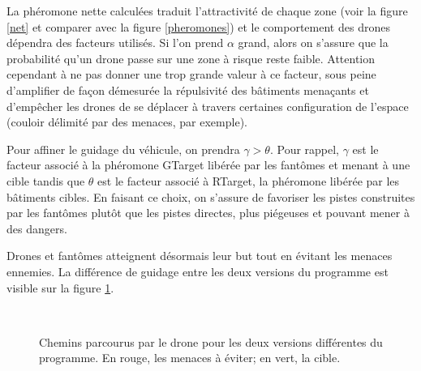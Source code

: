 \documentclass[12pt]{article}
\begin{document}
La phéromone nette calculées traduit l'attractivité de chaque zone
(voir la figure \ref{net} et comparer avec la figure \ref{pheromones})
et le comportement des drones dépendra des facteurs utilisés. Si l'on
prend $\alpha$ grand, alors on s'assure que la probabilité qu'un drone
passe sur une zone à risque reste faible. Attention cependant à ne pas
donner une trop grande valeur à ce facteur, sous peine d'amplifier de
façon démesurée la répulsivité des bâtiments menaçants et d'empêcher
les drones de se déplacer à travers certaines configuration de
l'espace (couloir délimité par des menaces, par exemple).

Pour affiner le guidage du véhicule, on prendra $\gamma >
\theta$. Pour rappel, $\gamma$ est le facteur associé à la phéromone
GTarget libérée par les fantômes et menant à une cible tandis que
$\theta$ est le facteur associé à RTarget, la phéromone libérée par
les bâtiments cibles. En faisant ce choix, on s'assure de favoriser
les pistes construites par les fantômes plutôt que les pistes
directes, plus piégeuses et pouvant mener à des dangers.

Drones et fantômes atteignent désormais leur but tout en évitant les
menaces ennemies. La différence de guidage entre les deux versions du
programme est visible sur la figure \ref{paths}.

\begin{figure}[H]
  \centering

  \mbox{
  }

  \caption{Chemins parcourus par le drone pour les deux versions
    différentes du programme. En rouge, les menaces à éviter; en vert,
    la cible.}
  \label{paths}
\end{figure}



\end{document}
